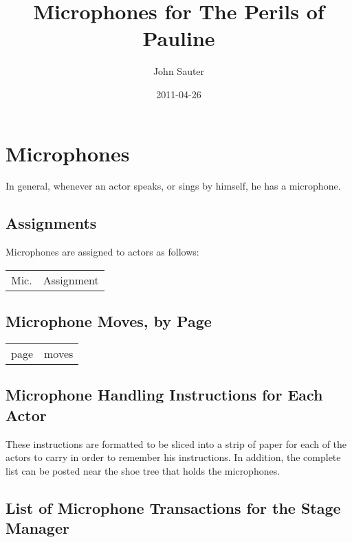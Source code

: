 \documentclass[letterpaper]{article}
\title{Microphones for The Perils of Pauline}
\author{John Sauter}
\date{2011-04-26}
\begin{document}
\maketitle
\tableofcontents
\newpage

\section {Microphones}
In general, whenever an actor speaks, or sings by himself, he has a microphone.

\subsection {Assignments}
Microphones are assigned to actors as follows:

\begin{center}
\begin{longtable}{|l|m{7in}|}
\hline Mic. & Assignment \endhead \hline

\end{longtable}
\end{center}

\subsection {Microphone Moves, by Page}

\begin{center}
\begin{longtable}{|l|m{7in}|}
\hline page & moves \endhead \hline

\end{longtable}
\end{center}

\subsection {Microphone Handling Instructions for Each Actor}

These instructions are formatted to be sliced into a strip of paper
for each of the actors to carry in order to remember his instructions.
In addition, the complete list can be posted near the shoe tree that
holds the microphones.

\vskip 0.25in

{\setlength{\parindent}{0in}

}

\subsection {List of Microphone Transactions for the Stage Manager}
\end{document}
